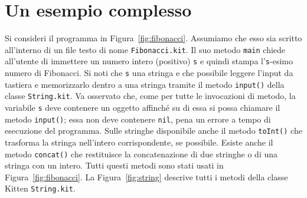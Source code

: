 \section{Un esempio \piu complesso}\label{sec:fibonacci}
%
Si consideri il programma in Figura~\ref{fig:fibonacci}. Assumiamo che esso
sia scritto all'interno di un file testo di nome \texttt{Fibonacci.kit}.
Il suo metodo \texttt{main} chiede all'utente di immettere un numero intero
(positivo) \texttt{s} e quindi stampa l'\texttt{s}-esimo numero di Fibonacci.
Si noti che \texttt{s} \e una stringa e che \e possibile leggere l'input da
tastiera e memorizzarlo dentro a una stringa tramite il metodo
\texttt{input()} della classe \texttt{String.kit}. Va osservato che, come
per tutte le invocazioni di metodo, la variabile \texttt{s} deve contenere
un oggetto affinch\'e su di essa si possa chiamare
il metodo \texttt{input()}; essa non deve contenere \texttt{nil}, pena
un errore a tempo di esecuzione del programma.
Sulle stringhe \e disponibile anche il metodo \texttt{toInt()} che trasforma
la stringa nell'intero corrispondente, se possibile. Esiste anche il metodo
\texttt{concat()} che restituisce la concatenazione di due stringhe o di
una stringa con un intero. Tutti questi metodi sono stati usati in
Figura~\ref{fig:fibonacci}. La Figura~\ref{fig:string} descrive tutti i
metodi della classe Kitten \texttt{String.kit}.
%
